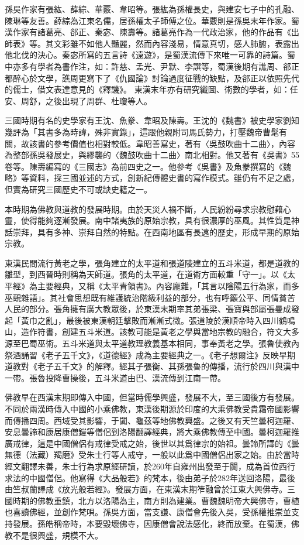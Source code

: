 孫吳作家有張紘、薛綜、華覈、韋昭等。張紘為孫權長史，與建安七子中的孔融、陳琳等友善。薛綜為江東名儒，居孫權太子師傅之位。華覈則是孫吳末年作家。蜀漢作家有諸葛亮、郤正、秦宓、陳壽等。諸葛亮作為一代政治家，他的作品有《出師表》等。其文彩雖不如他人豔麗，然而內容淺易，情意真切，感人肺腑，表露出他北伐的決心。秦宓所寫的五言詩《遠遊》，是蜀漢流傳下來唯一可靠的詩篇。蜀中亦多有學者為書作注，如：許慈、孟光、尹默、李譔等，蜀漢後期有譙周、郤正都醉心於文學，譙周更寫下了《仇國論》討論過度征戰的缺點，及郤正以依照先代的儒士，借文表達意見的《釋譏》。 東漢末年亦有研究纖圖、術數的學者，如：任安、周舒，之後出現了周群、杜瓊等人。

三國時期有名的史學家有王沈、魚豢、韋昭及陳壽。王沈的《魏書》被史學家劉知幾評為「其書多為時諱，殊非實錄」，這跟他親附司馬氏勢力，打壓魏帝曹髦有關，故該書的參考價值也相對較低。韋昭善寫史，著有〈吳鼓吹曲十二曲〉，內容為整部孫吳發展史，與繆襲的〈魏鼓吹曲十二曲〉南北相對。他又著有《吳書》55卷等。陳壽編寫的《三國志》為前四史之一。他參考《吳書》及魚豢撰寫的《魏略》等資料，採三國並述的方式，創新紀傳體史書的寫作模式。雖仍有不足之處，但實為研究三國歷史不可或缺史籍之一。

本時期為佛教與道教的發展時期。由於天災人禍不斷，人民紛紛尋求宗教慰藉心靈，使得能夠逐漸發展。南中諸夷族的原始宗教，具有很濃厚的巫風。其性質是神話崇拜，具有多神、崇拜自然的特點。在西南地區有長遠的歷史，形成早期的原始宗教。

東漢民間流行黃老之學，張角建立的太平道和張道陵建立的五斗米道，都是道教的雛型，到西晉時則稱為天師道。張角的太平道，在道術方面較重「守一」。以《太平經》為主要經典，又稱《太平青領書》。內容龐雜，「其言以陰陽五行為家，而多巫覡雜語」。其社會思想既有維護統治階級利益的部分，也有呼籲公平、同情貧苦人民的部分。張角擁有廣大教眾後，於東漢末期率其弟張梁、張寶與部屬張曼成發起「黃巾之亂」，最後被東漢朝廷擊敗而漸漸式微。張道陵於漢順帝時入四川鶴鳴山，造作符書，創建五斗米道。該教可能是黃老之學與當地宗教的融合，符文大多源至巴蜀巫術。五斗米道與太平道教理教義基本相同，事奉黃老之學。張魯使教內祭酒誦習《老子五千文》，《道德經》成為主要經典之一。《老子想爾注》反映早期道教對《老子五千文》的解釋。經其子張衡、其孫張魯的傳播，流行於四川與漢中一帶。張魯投降曹操後，五斗米道由巴、漢流傳到江南一帶。

佛教早在西漢末期即傳入中國，但當時儒學興盛，發展不大，至三國後方有發展。不同於兩漢時傳入中國的小乘佛教，東漢後期源於印度的大乘佛教受貴霜帝國影響而傳播四周。西域受其影響，于闐、龜茲等地佛教興盛。之後又有天竺曇柯迦羅、安息曇諦和康居康僧鎧等僧侶到洛陽翻譯經典，將大乘佛教傳至中國。曇柯迦羅推廣戒律，這是中國僧侶有戒律受戒之始，後世以其爲律宗的始祖。曇諦所譯的《曇無德（法藏）羯磨》受朱士行等人戒守，一般以此爲中國僧侶出家之始。由於當時經文翻譯未善，朱士行為求原經研讀，於260年自雍州出發至于闐，成為首位西行求法的中國僧侶。他寫得《大品般若》的梵本，後由弟子於282年送回洛陽，最後由竺叔蘭譯成《放光般若經》。發展方面，在東漢末期笮融曾於江東大興佛寺。三國時期的佛教重鎮，北方以洛陽為主，南方則為建業。曹魏魏明帝大興佛寺，曹植也喜讀佛經，並創作梵唄。孫吳方面，當支謙、康僧會先後入吳，受孫權推崇並支持發展。孫皓稱帝時，本要毀壞佛寺，因康僧會說法感化，終而放棄。在蜀漢，佛教不是很興盛，規模不大。

